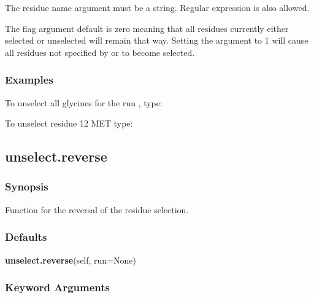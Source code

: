 The residue name argument must be a string.  Regular expression is also allowed.


The  flag argument default is zero meaning that all residues currently either selected or unselected will remain that way.  Setting the argument to 1 will cause all residues not specified by  or  to become selected.



\subsubsection{Examples}

To unselect all glycines for the run , type:




To unselect residue 12 MET type:









\newpage

\subsection{unselect.reverse}


\subsubsection{Synopsis}

Function for the reversal of the residue selection.



\subsubsection{Defaults}

\textsf{\textbf{unselect.reverse}(self, run=None)}


\subsubsection{Keyword Arguments}

